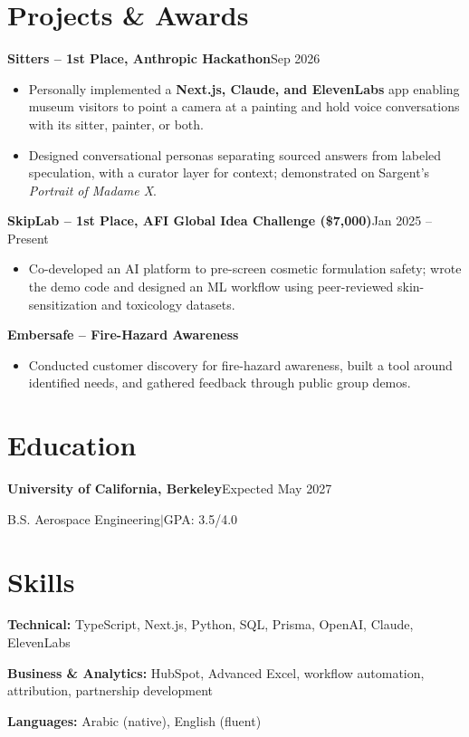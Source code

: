 \documentclass[a4paper,10pt]{article}
\newcommand{\project}[2]{\textbf{#1}\hfill #2\par}
\begin{document}
\section{Projects \& Awards}
\project{Sitters -- 1st Place, Anthropic Hackathon}{Sep 2026}
\begin{itemize}
  \item Personally implemented a \textbf{Next.js, Claude, and ElevenLabs} app enabling museum visitors to point a camera at a painting and hold voice conversations with its sitter, painter, or both.
  \item Designed conversational personas separating sourced answers from labeled speculation, with a curator layer for context; demonstrated on Sargent's \textit{Portrait of Madame X}.
\end{itemize}
\project{SkipLab -- 1st Place, AFI Global Idea Challenge (\$7,000)}{Jan 2025 -- Present}
\begin{itemize}
  \item Co-developed an AI platform to pre-screen cosmetic formulation safety; wrote the demo code and designed an ML workflow using peer-reviewed skin-sensitization and toxicology datasets.
\end{itemize}
\project{Embersafe -- Fire-Hazard Awareness}{}
\begin{itemize}
  \item Conducted customer discovery for fire-hazard awareness, built a tool around identified needs, and gathered feedback through public group demos.
\end{itemize}
\section{Education}
\textbf{University of California, Berkeley}\hfill Expected May 2027\par
B.S. Aerospace Engineering\enspace$|$\enspace GPA: 3.5/4.0\par

\section{Skills}
\textbf{Technical:} TypeScript, Next.js, Python, SQL, Prisma, OpenAI, Claude, ElevenLabs\par
\textbf{Business \& Analytics:} HubSpot, Advanced Excel, workflow automation, attribution, partnership development\par
\textbf{Languages:} Arabic (native), English (fluent)
\end{document}
